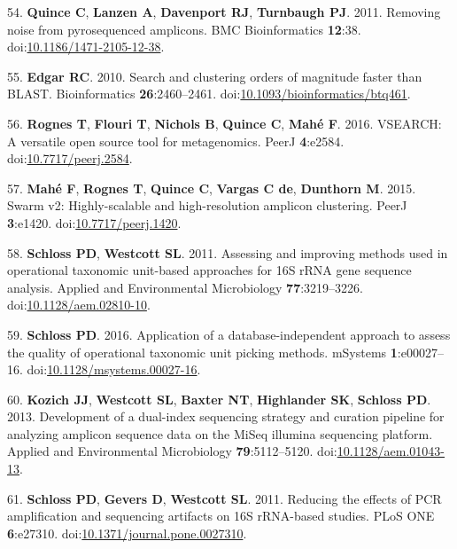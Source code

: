 \documentclass[11pt,]{article}
\begin{document}
\leavevmode\hypertarget{ref-Quince2011}{}%
54. \textbf{Quince C}, \textbf{Lanzen A}, \textbf{Davenport RJ},
\textbf{Turnbaugh PJ}. 2011. Removing noise from pyrosequenced
amplicons. BMC Bioinformatics \textbf{12}:38.
doi:\href{https://doi.org/10.1186/1471-2105-12-38}{10.1186/1471-2105-12-38}.

\leavevmode\hypertarget{ref-Edgar2010}{}%
55. \textbf{Edgar RC}. 2010. Search and clustering orders of magnitude
faster than BLAST. Bioinformatics \textbf{26}:2460--2461.
doi:\href{https://doi.org/10.1093/bioinformatics/btq461}{10.1093/bioinformatics/btq461}.

\leavevmode\hypertarget{ref-Rognes2016}{}%
56. \textbf{Rognes T}, \textbf{Flouri T}, \textbf{Nichols B},
\textbf{Quince C}, \textbf{Mahé F}. 2016. VSEARCH: A versatile open
source tool for metagenomics. PeerJ \textbf{4}:e2584.
doi:\href{https://doi.org/10.7717/peerj.2584}{10.7717/peerj.2584}.

\leavevmode\hypertarget{ref-Mah2015}{}%
57. \textbf{Mahé F}, \textbf{Rognes T}, \textbf{Quince C},
\textbf{Vargas C de}, \textbf{Dunthorn M}. 2015. Swarm v2:
Highly-scalable and high-resolution amplicon clustering. PeerJ
\textbf{3}:e1420.
doi:\href{https://doi.org/10.7717/peerj.1420}{10.7717/peerj.1420}.

\leavevmode\hypertarget{ref-Schloss2011a}{}%
58. \textbf{Schloss PD}, \textbf{Westcott SL}. 2011. Assessing and
improving methods used in operational taxonomic unit-based approaches
for 16S rRNA gene sequence analysis. Applied and Environmental
Microbiology \textbf{77}:3219--3226.
doi:\href{https://doi.org/10.1128/aem.02810-10}{10.1128/aem.02810-10}.

\leavevmode\hypertarget{ref-Schloss2016a}{}%
59. \textbf{Schloss PD}. 2016. Application of a database-independent
approach to assess the quality of operational taxonomic unit picking
methods. mSystems \textbf{1}:e00027--16.
doi:\href{https://doi.org/10.1128/msystems.00027-16}{10.1128/msystems.00027-16}.

\leavevmode\hypertarget{ref-Kozich2013}{}%
60. \textbf{Kozich JJ}, \textbf{Westcott SL}, \textbf{Baxter NT},
\textbf{Highlander SK}, \textbf{Schloss PD}. 2013. Development of a
dual-index sequencing strategy and curation pipeline for analyzing
amplicon sequence data on the MiSeq illumina sequencing platform.
Applied and Environmental Microbiology \textbf{79}:5112--5120.
doi:\href{https://doi.org/10.1128/aem.01043-13}{10.1128/aem.01043-13}.

\leavevmode\hypertarget{ref-Schloss2011b}{}%
61. \textbf{Schloss PD}, \textbf{Gevers D}, \textbf{Westcott SL}. 2011.
Reducing the effects of PCR amplification and sequencing artifacts on
16S rRNA-based studies. PLoS ONE \textbf{6}:e27310.
doi:\href{https://doi.org/10.1371/journal.pone.0027310}{10.1371/journal.pone.0027310}.
\end{document}
